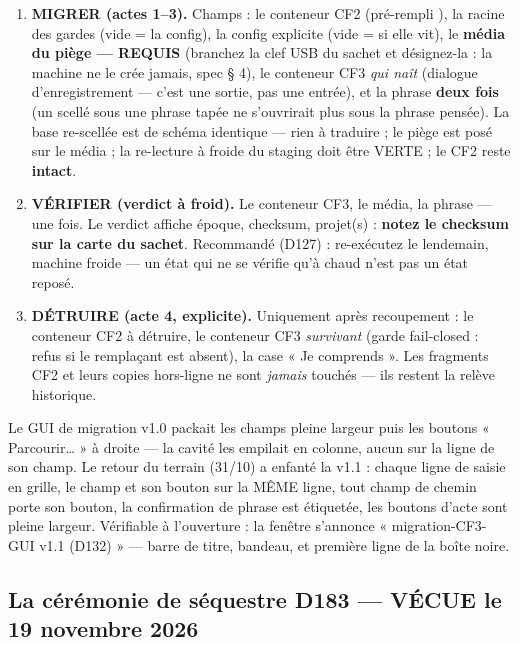 \begin{enumerate}
\item \textbf{MIGRER (actes 1--3).} Champs : le conteneur CF2 (pré-rempli
), la racine des gardes (vide = la
config), la config explicite (vide =  si
elle vit), le \textbf{média du piège — REQUIS} (branchez la clef USB du sachet et
désignez-la : la machine ne le crée jamais, spec § 4), le conteneur CF3 \emph{qui
naît} (dialogue d'enregistrement — c'est une sortie, pas une entrée), et la phrase
\textbf{deux fois} (un scellé sous une phrase tapée ne s'ouvrirait plus sous la
phrase pensée). La base re-scellée est de schéma identique — rien à traduire ; le
piège est posé sur le média ; la re-lecture à froide du staging doit être VERTE ; le
CF2 reste \textbf{intact}.
\item \textbf{VÉRIFIER (verdict à froid).} Le conteneur CF3, le média, la phrase —
une fois. Le verdict affiche époque, checksum, projet(s) : \textbf{notez le checksum
sur la carte du sachet}. Recommandé (D127) : re-exécutez le lendemain, machine
froide — un état qui ne se vérifie qu'à chaud n'est pas un état reposé.
\item \textbf{DÉTRUIRE (acte 4, explicite).} Uniquement après recoupement : le
conteneur CF2 à détruire, le conteneur CF3 \emph{survivant} (garde fail-closed : refus
si le remplaçant est absent), la case « Je comprends ». Les fragments CF2 et leurs
copies hors-ligne ne sont \emph{jamais} touchés — ils restent la relève historique.
\end{enumerate}

\begin{terrain}
Le GUI de migration v1.0 packait les champs pleine largeur puis les boutons
« Parcourir\ldots{} » à droite — la cavité les empilait en colonne, aucun sur la
ligne de son champ. Le retour du terrain (31/10) a enfanté la v1.1 : chaque ligne
de saisie en grille, le champ et son bouton sur la MÊME ligne, tout champ de chemin
porte son bouton, la confirmation de phrase est étiquetée, les boutons d'acte sont
pleine largeur. Vérifiable à l'ouverture : la fenêtre s'annonce
« migration-CF3-GUI v1.1 (D132) » — barre de titre, bandeau, et première ligne de la
boîte noire.
\end{terrain}

\subsection{La cérémonie de séquestre D183 — VÉCUE le 19 novembre 2026}\label{sec:cerd183}

